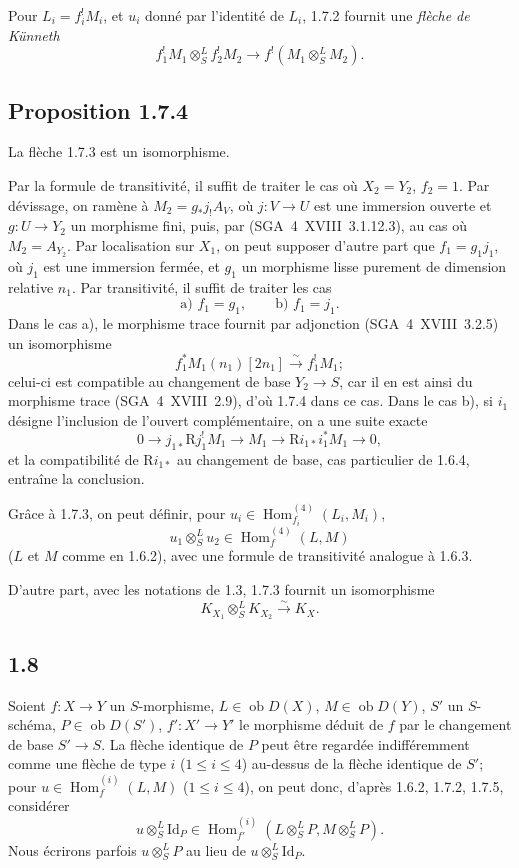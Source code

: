 \documentclass[11pt]{article}
\DeclareMathOperator{\Hom}{Hom}
\newcommand{\R}{\mathrm{R}}\newcommand{\RHomCore}{\mathrm{RHom}}
\newcommand{\ob}{\operatorname{ob}}
\providecommand{\Id}{\mathrm{Id}}
\providecommand{\Hom}{\operatorname{Hom}}
\providecommand{\ob}{\operatorname{ob}}
\providecommand{\R}{\mathrm R}
\providecommand{\Hom}{\operatorname{Hom}}
\begin{document}
Pour $L_i=f_i^{!}M_i$, et $u_i$ donné par l'identité de $L_i$, 1.7.2 fournit une \emph{flèche de Künneth}
\begin{equation}\tag{1.7.3}
f_1^{!}M_1\otimes^{L}_{S}f_2^{!}M_2\longrightarrow f^{!}(M_1\otimes^{L}_{S}M_2).
\end{equation}

\subsection*{Proposition 1.7.4}
La flèche 1.7.3 est un isomorphisme.

Par la formule de transitivité, il suffit de traiter le cas où $X_2=Y_2$, $f_2=1$. Par dévissage, on ramène à $M_2=g_{*}j_{!}A_V$, où $j:V\to U$ est une immersion ouverte et $g:U\to Y_2$ un morphisme fini, puis, par (SGA~4~XVIII~3.1.12.3), au cas où $M_2=A_{Y_2}$. Par localisation sur $X_1$, on peut supposer d'autre part que $f_1=g_1j_1$, où $j_1$ est une immersion fermée, et $g_1$ un morphisme lisse purement de dimension relative $n_1$. Par transitivité, il suffit de traiter les cas
\[
\text{a) } f_1=g_1,\qquad \text{b) } f_1=j_1.
\]
Dans le cas a), le morphisme trace fournit par adjonction (SGA~4~XVIII~3.2.5) un isomorphisme
\[
f_1^{*}M_1(n_1)[2n_1]\xrightarrow{\sim}f_1^{!}M_1;
\]
celui-ci est compatible au changement de base $Y_2\to S$, car il en est ainsi du morphisme trace (SGA~4~XVIII~2.9), d'où 1.7.4 dans ce cas. Dans le cas b), si $i_1$ désigne l'inclusion de l'ouvert complémentaire, on a une suite exacte
\[
0\longrightarrow j_{1*}\R j_1^{!}M_1\longrightarrow M_1\longrightarrow \R i_{1*}i_1^{*}M_1\longrightarrow0,
\]
et la compatibilité de $\R i_{1*}$ au changement de base, cas particulier de 1.6.4, entraîne la conclusion.

Grâce à 1.7.3, on peut définir, pour $u_i\in\Hom_{f_i}^{(4)}(L_i,M_i)$,
\begin{equation}\tag{1.7.5}
u_1\otimes^{L}_{S}u_2\in\Hom_f^{(4)}(L,M)
\end{equation}
($L$ et $M$ comme en 1.6.2), avec une formule de transitivité analogue à 1.6.3.

D'autre part, avec les notations de 1.3, 1.7.3 fournit un isomorphisme
\begin{equation}\tag{1.7.6}
K_{X_1}\otimes^{L}_{S}K_{X_2}\xrightarrow{\sim}K_X.
\end{equation}

\subsection*{1.8}
Soient $f:X\to Y$ un $S$-morphisme, $L\in\ob D(X)$, $M\in\ob D(Y)$, $S'$ un $S$-schéma, $P\in\ob D(S')$, $f':X'\to Y'$ le morphisme déduit de $f$ par le changement de base $S'\to S$. La flèche identique de $P$ peut être regardée indifféremment comme une flèche de type $i$ ($1\leq i\leq4$) au-dessus de la flèche identique de $S'$; pour $u\in\Hom_f^{(i)}(L,M)$ ($1\leq i\leq4$), on peut donc, d'après 1.6.2, 1.7.2, 1.7.5, considérer
\begin{equation}\tag{1.8.1}
u\otimes^{L}_{S}\Id_P\in\Hom_{f'}^{(i)}(L\otimes^{L}_{S}P,M\otimes^{L}_{S}P).
\end{equation}
Nous écrirons parfois $u\otimes^{L}_{S}P$ au lieu de $u\otimes^{L}_{S}\Id_P$.
\end{document}
